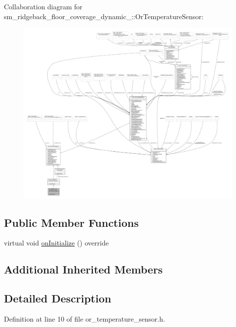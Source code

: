 Collaboration diagram for sm\+\_\+ridgeback\+\_\+floor\+\_\+coverage\+\_\+dynamic\+\_\+:\+:Or\+Temperature\+Sensor\+:
\nopagebreak
\begin{figure}[H]
\begin{center}
\leavevmode
\includegraphics[width=350pt]{classsm__ridgeback__floor__coverage__dynamic__1_1_1OrTemperatureSensor__coll__graph}
\end{center}
\end{figure}
\subsection*{Public Member Functions}
\begin{DoxyCompactItemize}
\item 
virtual void \hyperlink{classsm__ridgeback__floor__coverage__dynamic__1_1_1OrTemperatureSensor_a492e0aa0c05b86c10458997a8367a42b}{on\+Initialize} () override
\end{DoxyCompactItemize}
\subsection*{Additional Inherited Members}


\subsection{Detailed Description}


Definition at line 10 of file or\+\_\+temperature\+\_\+sensor.\+h.



